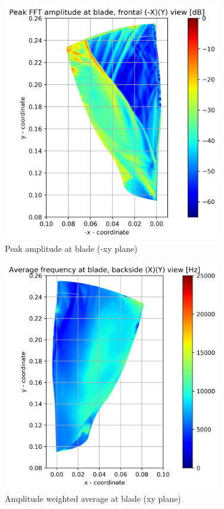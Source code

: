 \begin{figure}[ht]
	\centering
	\includegraphics[width=0.85\textwidth]{Figures/blade-negxy-peak-mag.png}
	\caption{Peak amplitude at blade (-xy plane)} \label{blade-negxy-peak-mag}
\end{figure}
\begin{figure}[ht]
	\centering
	\includegraphics[width=0.85\textwidth]{Figures/blade-xy-awaf.png}
    \caption{Amplitude weighted average at blade (xy plane)} \label{blade-xy-awaf}
\end{figure}	


